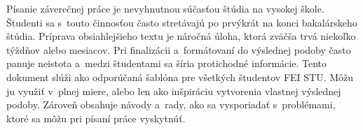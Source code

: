 Písanie záverečnej práce je nevyhnutnou súčasťou štúdia na vysokej škole.
Študenti sa s~touto činnosťou často stretávajú po prvýkrát na konci bakalárskeho štúdia.
Príprava obsiahlejšieho textu je náročná úloha,
ktorá zväčša trvá niekoľko týždňov alebo mesiacov.
Pri finalizácii a~formátovaní do výslednej podoby často panuje neistota a~medzi študentami sa šíria protichodné informácie.
Tento dokument slúži ako odporúčaná šablóna pre všetkých študentov FEI STU.
Môžu ju využiť v~plnej miere, alebo len ako inšpiráciu vytvorenia vlastnej výslednej podoby.
Zároveň obsahuje návody a~rady,
ako sa vysporiadať s~problémami,
ktoré sa môžu pri písaní práce vyskytnúť.
